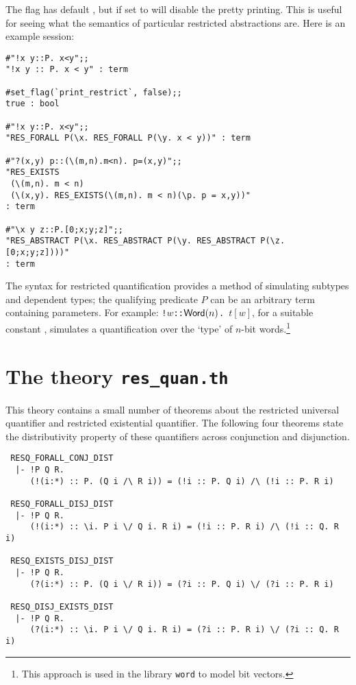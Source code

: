 The flag  has default , but if set to 
 will
disable the pretty printing. This is useful for seeing what the
semantics of particular restricted abstractions are.
Here is an example session:

\setcounter{sessioncount}{1}
\begin{session}\begin{verbatim}
#"!x y::P. x<y";;
"!x y :: P. x < y" : term

#set_flag(`print_restrict`, false);;
true : bool

#"!x y::P. x<y";;
"RES_FORALL P(\x. RES_FORALL P(\y. x < y))" : term

#"?(x,y) p::(\(m,n).m<n). p=(x,y)";;
"RES_EXISTS
 (\(m,n). m < n)
 (\(x,y). RES_EXISTS(\(m,n). m < n)(\p. p = x,y))"
: term

#"\x y z::P.[0;x;y;z]";;
"RES_ABSTRACT P(\x. RES_ABSTRACT P(\y. RES_ABSTRACT P(\z. [0;x;y;z])))"
: term
\end{verbatim}\end{session}

The syntax for restricted quantification provides a method of
simulating subtypes and dependent types; the qualifying predicate $P$ can be
an arbitrary term containing parameters. For example:
{\small\verb|!|}$w${\small\verb|::|}${\sf Word}(n)${\small\verb|. |}$t[w]$,
for a suitable constant , simulates a quantification over the
`type' of $n$-bit words.\footnote{This approach is used in the library
{\tt word} to model bit vectors.}

\section{The theory {\tt res\_quan.{}th}}

This theory contains a small number of theorems about the restricted
universal quantifier and restricted existential quantifier.
The following four theorems state the distributivity property of these
quantifiers across conjunction and disjunction.
\begin{verbatim}
 RESQ_FORALL_CONJ_DIST
  |- !P Q R. 
     (!(i:*) :: P. (Q i /\ R i)) = (!i :: P. Q i) /\ (!i :: P. R i)

 RESQ_FORALL_DISJ_DIST
  |- !P Q R.
     (!(i:*) :: \i. P i \/ Q i. R i) = (!i :: P. R i) /\ (!i :: Q. R i)

 RESQ_EXISTS_DISJ_DIST
  |- !P Q R.
     (?(i:*) :: P. (Q i \/ R i)) = (?i :: P. Q i) \/ (?i :: P. R i)

 RESQ_DISJ_EXISTS_DIST
  |- !P Q R.
     (?(i:*) :: \i. P i \/ Q i. R i) = (?i :: P. R i) \/ (?i :: Q. R i)
\end{verbatim}

